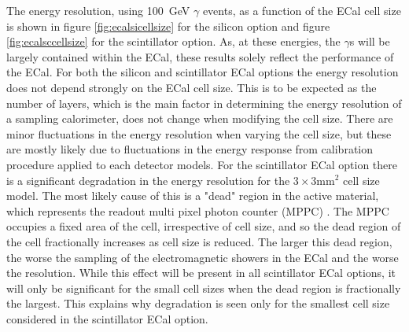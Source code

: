 The energy resolution, using 100~GeV $\gamma$ events, as a function of the ECal cell size is shown in figure \ref{fig:ecalsicellsize} for the silicon option and figure \ref{fig:ecalsccellsize} for the scintillator option.  As, at these energies, the $\gamma$s will be largely contained within the ECal, these results solely reflect the performance of the ECal.  For both the silicon and scintillator ECal options the energy resolution does not depend strongly on the ECal cell size.  This is to be expected as the number of layers, which is the main factor in determining the energy resolution of a sampling calorimeter, does not change when modifying the cell size.  There are minor fluctuations in the energy resolution when varying the cell size, but these are mostly likely due to fluctuations in the energy response from calibration procedure applied to each detector models.  For the scintillator ECal option there is a significant degradation in the energy resolution for the $3 \times 3 \text{mm}^{2}$ cell size model.  The most likely cause of this is a "dead" region in the active material, which represents the readout multi pixel photon counter (MPPC) \cite{arXiv:1006.3396}.  The MPPC occupies a fixed area of the cell, irrespective of cell size, and so the dead region of the cell fractionally increases as cell size is reduced.  The larger this dead region, the worse the sampling of the electromagnetic showers in the ECal and the worse the resolution.  While this effect will be present in all scintillator ECal options, it will only be significant for the small cell sizes when the dead region is fractionally the largest.  This explains why degradation is seen only for the smallest cell size considered in the scintillator ECal option.     

